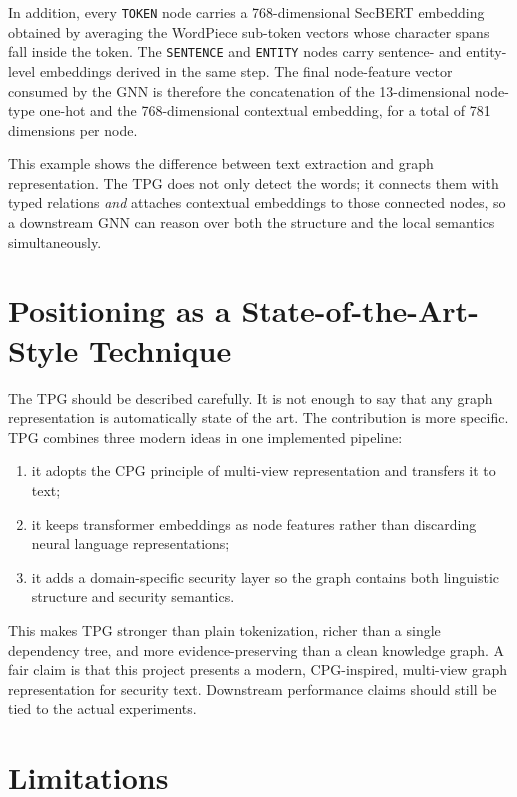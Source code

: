 \documentclass[11pt]{article}
\begin{document}
In addition, every \texttt{TOKEN} node carries a 768-dimensional SecBERT
embedding obtained by averaging the WordPiece sub-token vectors whose character
spans fall inside the token. The \texttt{SENTENCE} and \texttt{ENTITY} nodes
carry sentence- and entity-level embeddings derived in the same step. The
final node-feature vector consumed by the GNN is therefore the concatenation
of the 13-dimensional node-type one-hot and the 768-dimensional contextual
embedding, for a total of 781 dimensions per node.

This example shows the difference between text extraction and graph
representation. The TPG does not only detect the words; it connects them with
typed relations \emph{and} attaches contextual embeddings to those connected
nodes, so a downstream GNN can reason over both the structure and the local
semantics simultaneously.

\section{Positioning as a State-of-the-Art-Style Technique}

The TPG should be described carefully. It is not enough to say that any graph
representation is automatically state of the art. The contribution is more
specific. TPG combines three modern ideas in one implemented pipeline:

\begin{enumerate}
    \item it adopts the CPG principle of multi-view representation and
    transfers it to text;
    \item it keeps transformer embeddings as node features rather than
    discarding neural language representations;
    \item it adds a domain-specific security layer so the graph contains both
    linguistic structure and security semantics.
\end{enumerate}

This makes TPG stronger than plain tokenization, richer than a single
dependency tree, and more evidence-preserving than a clean knowledge graph. A
fair claim is that this project presents a modern, CPG-inspired, multi-view
graph representation for security text. Downstream performance claims should
still be tied to the actual experiments.

\section{Limitations}
\end{document}
